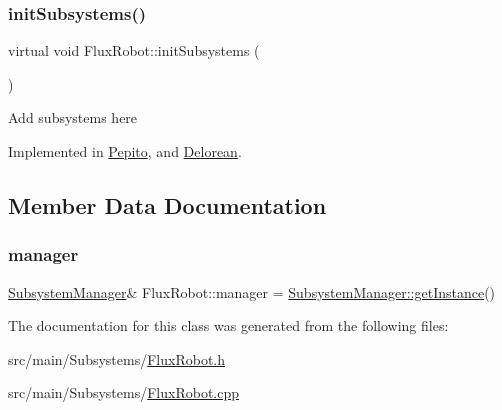 \subsubsection{\texorpdfstring{init\+Subsystems()}{initSubsystems()}}
{\footnotesize\ttfamily virtual void Flux\+Robot\+::init\+Subsystems (\begin{DoxyParamCaption}{ }\end{DoxyParamCaption})\hspace{0.3cm}{\ttfamily [pure virtual]}}

Add subsystems here 

Implemented in \hyperlink{classPepito_a420a3322a1fa658e9e40f277e7cc1c03}{Pepito}, and \hyperlink{classDelorean_a8ccfc53654ee0512a7e6ba1d6ba739c0}{Delorean}.



\subsection{Member Data Documentation}
\mbox{\label{classFluxRobot_a55d2406f800dddb8f7d4754ef5fb2ede}} 
\subsubsection{\texorpdfstring{manager}{manager}}
{\footnotesize\ttfamily \hyperlink{classSubsystemManager}{Subsystem\+Manager}\& Flux\+Robot\+::manager = \hyperlink{classSubsystemManager_a3acce674e15d2534ed8a0877b78ac64d}{Subsystem\+Manager\+::get\+Instance}()\hspace{0.3cm}{\ttfamily [protected]}}



The documentation for this class was generated from the following files\+:\begin{DoxyCompactItemize}
\item 
src/main/\+Subsystems/\hyperlink{FluxRobot_8h}{Flux\+Robot.\+h}\item 
src/main/\+Subsystems/\hyperlink{FluxRobot_8cpp}{Flux\+Robot.\+cpp}\end{DoxyCompactItemize}
